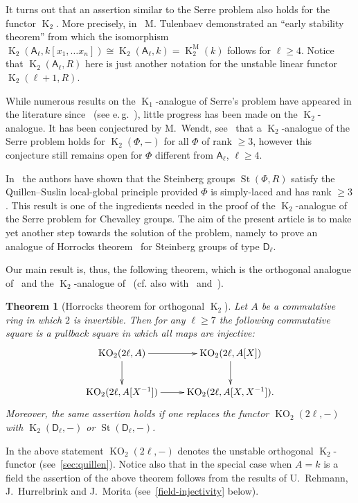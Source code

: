 \documentclass[oneside, 8pt]{amsart}
\newtheorem{theorem}{Theorem}
\theoremstyle{remark}
\theoremstyle{definition}
\numberwithin{lemma}{section}
\numberwithin{prop}{section}
\numberwithin{corollary}{section}
\numberwithin{externaltheorem}{section}
\DeclareMathOperator{\St}{St}
\DeclareMathOperator{\K}{K}
\DeclareMathOperator{\KO}{KO}
\newcommand{\inv}{^{-1}}
\newcommand{\rA}{\mathsf{A}}
\newcommand{\rD}{\mathsf{D}}
\numberwithin{equation}{section}
\begin{document}
It turns out that an assertion similar to the Serre problem also holds for the functor $\K_2$. More precisely, in~\cite{Tu83} M. Tulenbaev demonstrated an ``early stability theorem'' from which the isomorphism $\K_2(\rA_\ell, k[x_1, \ldots x_n]) \cong \K_2(\rA_\ell, k) = \K^\mathrm{M}_2(k)$ follows for $\ell \geq 4$. Notice that $\K_2(\rA_\ell, R)$ here is just another notation for the unstable linear functor $\K_2(\ell+1, R)$.

While numerous results on the $\K_1$-analogue of Serre's problem have appeared in the literature since~\cite{Su77} (see e.\,g.~\cite{Su82, Abe83, St-poly, St-Ded}), little progress has been made on the $\K_2$-analogue. It has been conjectured by M.~Wendt, see~\cite[Vermutung~6.22]{Vo11} that a $\K_2$-analogue of the Serre problem holds for $\K_2(\Phi, -)$ for all $\Phi$ of rank $\geq 3$, however this conjecture still remains open for $\Phi$ different from $\rA_\ell$, $\ell \geq 4$.

In~\cite{LS17} the authors have shown that the Steinberg groups $\St(\Phi, R)$ satisfy the Quillen--Suslin local-global principle provided $\Phi$ is simply-laced and has rank $\geq 3$. This result is one of the ingredients needed in the proof of the $\K_2$-analogue of the Serre problem for Chevalley groups. The aim of the present article is to make yet another step towards the solution of the problem, namely to prove an analogue of Horrocks theorem~\cite{Ho64} for Steinberg groups of type $\rD_\ell$.

Our main result is, thus, the following theorem, which is the orthogonal analogue of~\cite[Theorem~5.1]{Tu83} and the $\K_2$-analogue of~\cite[Theorem~6.8]{Su82} (cf. also with~\cite[Theorem~VI.5.2]{Lam10} and~\cite[Theorem~1.1]{St-poly}).
\begin{theorem}[Horrocks theorem for orthogonal $\K_2$]\label{thm:main} Let $A$ be a commutative ring in which $2$ is invertible. Then for any $\ell \geq 7$ the following commutative square is a pullback square in which all maps are injective:
\begin{equation} \nonumber
  \xymatrix{ \KO_2(2\ell, A) \ar[r] \ar[d] & \KO_2(2\ell, A[X]) \ar[d] \\ \KO_2(2\ell, A[X\inv]) \ar[r] & \KO_2(2\ell, A[X, X\inv]).}  
\end{equation} 
Moreover, the same assertion holds if one replaces the functor $\KO_2(2\ell, -)$ with $\K_2(\rD_\ell, -)$ or $\St(\rD_\ell, -)$. \end{theorem}
In the above statement $\KO_2(2\ell, -)$ denotes the unstable orthogonal $\K_2$-functor (see~\cref{sec:quillen}). Notice also that in the special case when $A=k$ is a field the assertion of the above theorem follows from the results of U.~Rehmann, J.~Hurrelbrink and J.~Morita (see~\cref{field-injectivity} below).
\end{document}
